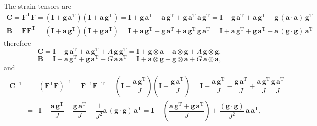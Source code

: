 \documentclass[11pt,a4paper]{article}
\newcommand{\Id}{\textbf{I}}
\begin{document}
The strain tensors are
%
\begin{eqnarray}
\textbf{C}=\textbf{F}^\text{T}\textbf{F}=\left( \Id+\textbf{g}\,\textbf{a}^{\text{T}}\right)\left( \Id+\textbf{a}\,\textbf{g}^{\text{T}}\right) =\Id+\textbf{g}\,\textbf{a}^{\text{T}}+\textbf{a}\,\textbf{g}^{\text{T}}+\textbf{g}\,\textbf{a}^{\text{T}}\,\textbf{a}\,\textbf{g}^{\text{T}}=\Id+\textbf{g}\,\textbf{a}^{\text{T}}+\textbf{a}\,\textbf{g}^{\text{T}}+\textbf{g}\,(\textbf{a}\cdot\textbf{a})\,\textbf{g}^{\text{T}}
\end{eqnarray}
%
\begin{eqnarray}
\textbf{B}=\textbf{F}\textbf{F}^\text{T}=\left( \Id+\textbf{a}\,\textbf{g}^{\text{T}}\right)\left( \Id+\textbf{g}\,\textbf{a}^{\text{T}}\right) =\Id+\textbf{a}\,\textbf{g}^{\text{T}}+\textbf{g}\,\textbf{a}^{\text{T}}+\textbf{a}\,\textbf{g}^{\text{T}}\,\textbf{g}\,\textbf{a}^{\text{T}}=\Id+\textbf{a}\,\textbf{g}^{\text{T}}+\textbf{g}\,\textbf{a}^{\text{T}}+\textbf{a}\,(\textbf{g}\cdot\textbf{g})\,\textbf{a}^{\text{T}}
\end{eqnarray}
%
therefore
%
\begin{equation}
\boxed{
\textbf{C}
=\Id+\textbf{g}\,\textbf{a}^{\text{T}}+\textbf{a}\,\textbf{g}^{\text{T}}+A\,\textbf{g}\,\textbf{g}^{\text{T}}=\Id+\textbf{g}\otimes\textbf{a}
+\textbf{a}\otimes\textbf{g}
+A\,\textbf{g}\otimes\textbf{g}
},
\label{eq_Ccompact}
\end{equation}
%
\begin{equation}
\boxed{
\textbf{B}
=\Id+\textbf{a}\,\textbf{g}^{\text{T}}+\textbf{g}\,\textbf{a}^{\text{T}}+G\,\textbf{a}\,\textbf{a}^{\text{T}}=\Id+\textbf{a}\otimes\textbf{g}
+\textbf{g}\otimes\textbf{a}
+G\,\textbf{a}\otimes\textbf{a}
},
\label{eq_Bcompact}
\end{equation}
%
and
%
\begin{eqnarray}
\begin{array}{rcl}
\textbf{C}^{-1}&=&\left(\textbf{F}^\text{T}\textbf{F}\right)^{-1} =\textbf{F}^{-1}\textbf{F}^{-\text{T}}=\left( \Id-\dfrac{\textbf{a}\,\textbf{g}^\text{T}}{J}\right) \left(\Id-\dfrac{\textbf{g}\,\textbf{a}^\text{T}}{J} \right) =\Id -\dfrac{\textbf{a}\,\textbf{g}^\text{T}}{J}-\dfrac{\textbf{g}\,\textbf{a}^\text{T}}{J}+\dfrac{\textbf{a}\,\textbf{g}^\text{T}}{J}\dfrac{\textbf{g}\,\textbf{a}^\text{T}}{J}\\
&=&\Id -\dfrac{\textbf{a}\,\textbf{g}^\text{T}}{J}-\dfrac{\textbf{g}\,\textbf{a}^\text{T}}{J}+\dfrac{1}{J^2}\textbf{a}\,\left( \textbf{g}\cdot\textbf{g}\right) \,\textbf{a}^\text{T}=\Id -\left( \dfrac{\textbf{a}\,\textbf{g}^\text{T}+\textbf{g}\,\textbf{a}^\text{T}}{J}\right) +\dfrac{\left( \textbf{g}\cdot\textbf{g}\right)}{J^2}\,\textbf{a}\, \textbf{a}^\text{T},
\end{array}
\end{eqnarray}
\end{document}
